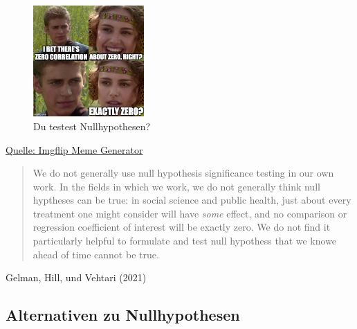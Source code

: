 \documentclass[
  a4paper,
  DIV=11]{scrreprt}
\theoremstyle{definition}
\theoremstyle{remark}
\begin{document}
\begin{figure}

{\centering \includegraphics[width=1.67in,height=\textheight]{./img/5v5531.jpg}

}

\caption{\label{fig-nullmeme}Du testest Nullhypothesen?}

\end{figure}

\href{https://imgflip.com/i/5v5531}{Quelle: Imgflip Meme Generator}

\begin{quote}
We do not generally use null hypothesis significance testing in our own
work. In the fields in which we work, we do not generally think null
hyptheses can be true: in social science and public health, just about
every treatment one might consider will have \emph{some} effect, and no
comparison or regression coefficient of interest will be exactly zero.
We do not find it particularly helpful to formulate and test null
hypothess that we knowe ahead of time cannot be true.
\end{quote}

Gelman, Hill, und Vehtari (2021)

\hypertarget{alternativen-zu-nullhypothesen}{%
\subsection{Alternativen zu
Nullhypothesen}\label{alternativen-zu-nullhypothesen}}
\end{document}
